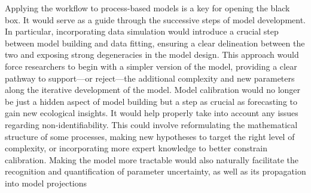 \documentclass[11pt]{article}
\begin{document}
Applying the workflow to process-based models is a key for opening the black box. It would serve as a guide through the successive steps of model development. In particular, incorporating data simulation would introduce a crucial step between model building and data fitting, ensuring a clear delineation between the two and exposing strong degeneracies in the model design. This approach would force researchers to begin with a simpler version of the model, providing a clear pathway to support---or reject---the additional complexity and new parameters along the iterative development of the model. 
Model calibration would no longer be just a hidden aspect of model building but a step as crucial as forecasting to gain new ecological insights. It would help properly take into account any issues regarding non-identifiability. This could involve reformulating the mathematical structure of some processes, making new hypotheses to target the right level of complexity, or incorporating more expert knowledge to better constrain calibration. Making the model more tractable would also naturally facilitate the recognition and quantification of parameter uncertainty, as well as its propagation into model projections
\end{document}
